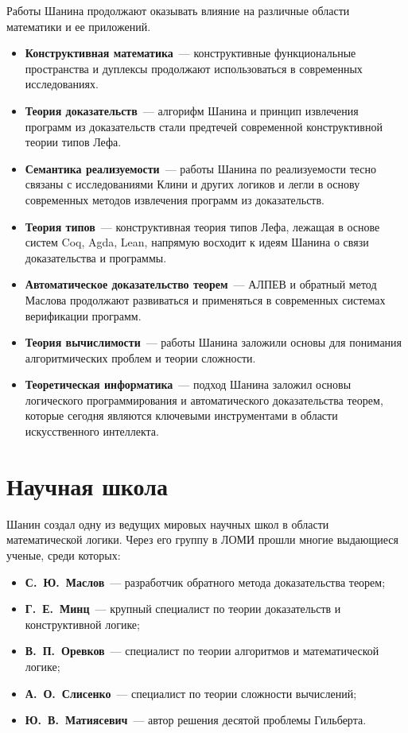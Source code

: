 \documentclass[essay,paper]{pmk-graduate}
\begin{document}
Работы Шанина продолжают оказывать влияние на различные области математики и ее приложений.
\begin{itemize}
    \item \textbf{Конструктивная математика}~--- конструктивные функциональные пространства и дуплексы продолжают использоваться в современных исследованиях.
    \item \textbf{Теория доказательств}~--- алгорифм Шанина и принцип извлечения программ из доказательств стали предтечей современной конструктивной теории типов Лефа.
    \item \textbf{Семантика реализуемости}~--- работы Шанина по реализуемости тесно связаны с исследованиями Клини и других логиков и легли в основу современных методов извлечения программ из доказательств.
    \item \textbf{Теория типов}~--- конструктивная теория типов Лефа, лежащая в основе систем Coq, Agda, Lean, напрямую восходит к идеям Шанина о связи доказательства и программы.
    \item \textbf{Автоматическое доказательство теорем}~--- АЛПЕВ и обратный метод Маслова продолжают развиваться и применяться в современных системах верификации программ.
    \item \textbf{Теория вычислимости}~--- работы Шанина заложили основы для понимания алгоритмических проблем и теории сложности.
    \item \textbf{Теоретическая информатика}~--- подход Шанина заложил основы логического программирования и автоматического доказательства теорем, которые сегодня являются ключевыми инструментами в области искусственного интеллекта.
\end{itemize}

\section{Научная школа}

Шанин создал одну из ведущих мировых научных школ в области математической логики. Через его группу в ЛОМИ прошли многие выдающиеся ученые, среди которых:
\begin{itemize}
    \item \textbf{С.~Ю.~Маслов}~--- разработчик обратного метода доказательства теорем;
    \item \textbf{Г.~Е.~Минц}~--- крупный специалист по теории доказательств и конструктивной логике;
    \item \textbf{В.~П.~Оревков}~--- специалист по теории алгоритмов и математической логике;
    \item \textbf{А.~О.~Слисенко}~--- специалист по теории сложности вычислений;
    \item \textbf{Ю.~В.~Матиясевич}~--- автор решения десятой проблемы Гильберта.
\end{itemize}
\end{document}

